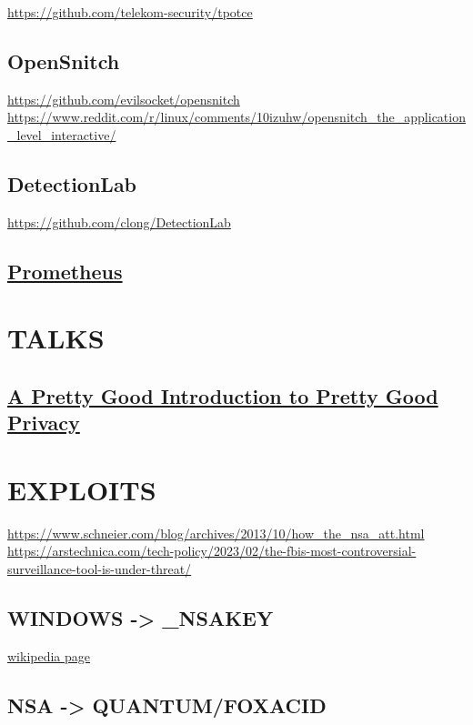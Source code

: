 \documentclass[11pt]{article}
\begin{document}
\url{https://github.com/telekom-security/tpotce}

\subsection{OpenSnitch}
\label{sec:org0f8d10c}

\url{https://github.com/evilsocket/opensnitch}
\url{https://www.reddit.com/r/linux/comments/10izuhw/opensnitch\_the\_application\_level\_interactive/}

\subsection{DetectionLab}
\label{sec:org4c2d5ee}

\url{https://github.com/clong/DetectionLab}

\subsection{\href{20230415-prometheus.org}{Prometheus}}
\label{sec:org740b596}
\section{TALKS}
\label{sec:orgd21c2ec}
\subsection{\href{../1_talks/20230504-a_pretty_good_introduction_to_pretty_good_privacy.org}{A Pretty Good Introduction to Pretty Good Privacy}}
\label{sec:orgfce26d1}
\section{EXPLOITS}
\label{sec:orgd5e3505}

\url{https://www.schneier.com/blog/archives/2013/10/how\_the\_nsa\_att.html}
\url{https://arstechnica.com/tech-policy/2023/02/the-fbis-most-controversial-surveillance-tool-is-under-threat/}

\subsection{WINDOWS -> \_NSAKEY}
\label{sec:org41342b5}

\href{https://en.m.wikipedia.org/wiki/NSAKEY}{wikipedia page}

\subsection{NSA -> QUANTUM/FOXACID}
\label{sec:orgb9627b1}
\end{document}
